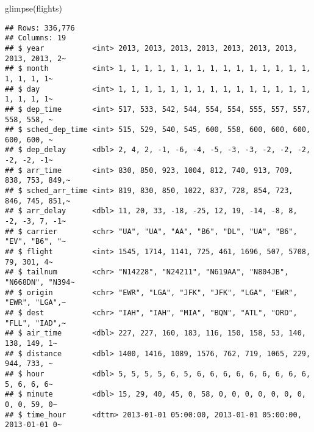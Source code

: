 \documentclass[
]{article}
\newenvironment{Shaded}{\begin{snugshade}}{\end{snugshade}}
\newcommand{\CommentTok}[1]{\textcolor[rgb]{0.56,0.35,0.01}{\textit{#1}}}
\newcommand{\FunctionTok}[1]{\textcolor[rgb]{0.00,0.00,0.00}{#1}}
\newcommand{\NormalTok}[1]{#1}
\newcommand{\OtherTok}[1]{\textcolor[rgb]{0.56,0.35,0.01}{#1}}
\newcommand{\SpecialCharTok}[1]{\textcolor[rgb]{0.00,0.00,0.00}{#1}}
\begin{document}
\begin{Shaded}
\begin{Highlighting}[]
  \FunctionTok{glimpse}\NormalTok{(flights)}
\end{Highlighting}
\end{Shaded}

\begin{verbatim}
## Rows: 336,776
## Columns: 19
## $ year           <int> 2013, 2013, 2013, 2013, 2013, 2013, 2013, 2013, 2013, 2~
## $ month          <int> 1, 1, 1, 1, 1, 1, 1, 1, 1, 1, 1, 1, 1, 1, 1, 1, 1, 1, 1~
## $ day            <int> 1, 1, 1, 1, 1, 1, 1, 1, 1, 1, 1, 1, 1, 1, 1, 1, 1, 1, 1~
## $ dep_time       <int> 517, 533, 542, 544, 554, 554, 555, 557, 557, 558, 558, ~
## $ sched_dep_time <int> 515, 529, 540, 545, 600, 558, 600, 600, 600, 600, 600, ~
## $ dep_delay      <dbl> 2, 4, 2, -1, -6, -4, -5, -3, -3, -2, -2, -2, -2, -2, -1~
## $ arr_time       <int> 830, 850, 923, 1004, 812, 740, 913, 709, 838, 753, 849,~
## $ sched_arr_time <int> 819, 830, 850, 1022, 837, 728, 854, 723, 846, 745, 851,~
## $ arr_delay      <dbl> 11, 20, 33, -18, -25, 12, 19, -14, -8, 8, -2, -3, 7, -1~
## $ carrier        <chr> "UA", "UA", "AA", "B6", "DL", "UA", "B6", "EV", "B6", "~
## $ flight         <int> 1545, 1714, 1141, 725, 461, 1696, 507, 5708, 79, 301, 4~
## $ tailnum        <chr> "N14228", "N24211", "N619AA", "N804JB", "N668DN", "N394~
## $ origin         <chr> "EWR", "LGA", "JFK", "JFK", "LGA", "EWR", "EWR", "LGA",~
## $ dest           <chr> "IAH", "IAH", "MIA", "BQN", "ATL", "ORD", "FLL", "IAD",~
## $ air_time       <dbl> 227, 227, 160, 183, 116, 150, 158, 53, 140, 138, 149, 1~
## $ distance       <dbl> 1400, 1416, 1089, 1576, 762, 719, 1065, 229, 944, 733, ~
## $ hour           <dbl> 5, 5, 5, 5, 6, 5, 6, 6, 6, 6, 6, 6, 6, 6, 6, 5, 6, 6, 6~
## $ minute         <dbl> 15, 29, 40, 45, 0, 58, 0, 0, 0, 0, 0, 0, 0, 0, 0, 59, 0~
## $ time_hour      <dttm> 2013-01-01 05:00:00, 2013-01-01 05:00:00, 2013-01-01 0~
\end{verbatim}

\begin{Shaded}
\end{Shaded}
\end{document}
